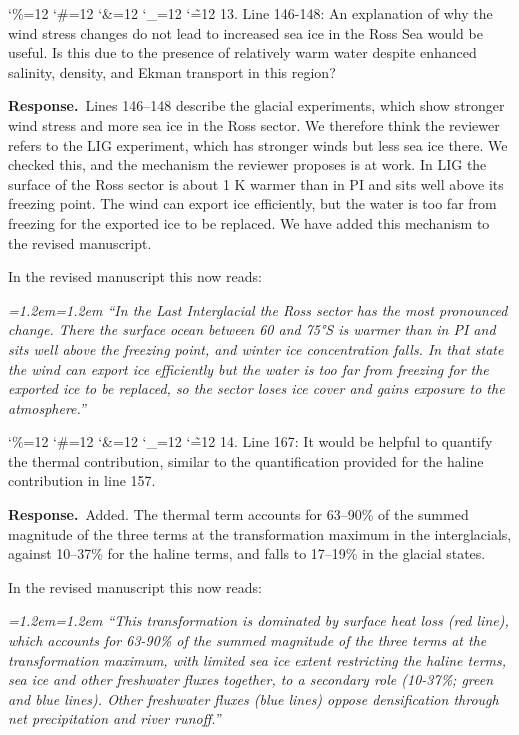 \documentclass[11pt,a4paper]{article}
\newcommand{\comment}[1]{\par\medskip\noindent\color{black}\begingroup\catcode`\%=12 \catcode`\#=12 \catcode`\&=12 \catcode`\_=12 \catcode`\~=12 \commentbody}
\newcommand{\commentbody}[1]{#1\endgroup\par\smallskip}
\newcommand{\response}{\par\noindent\color{chgcol}\textbf{Response.}\ }
\newenvironment{change}{\par\smallskip\color{chgcol}\small\itshape\leftskip=1.2em\rightskip=1.2em\noindent\ignorespaces}{\par\smallskip}
\begin{document}
\textit{ }

\comment{R1}{13. Line 146-148: An explanation of why the wind stress changes do not lead to increased sea ice in the Ross Sea would be useful. Is this due to the presence of relatively warm water despite enhanced salinity, density, and Ekman transport in this region?}

\response Lines 146--148 describe the glacial experiments, which show stronger wind stress and more sea ice in the Ross sector. We therefore think the reviewer refers to the LIG experiment, which has stronger winds but less sea ice there. We checked this, and the mechanism the reviewer proposes is at work. In LIG the surface of the Ross sector is about 1 K warmer than in PI and sits well above its freezing point. The wind can export ice efficiently, but the water is too far from freezing for the exported ice to be replaced. We have added this mechanism to the revised manuscript.


In the revised manuscript this now reads:

\begin{change}
``In the Last Interglacial the Ross sector has the most pronounced change. There the surface ocean between 60 and 75°S is warmer than in PI and sits well above the freezing point, and winter ice concentration falls. In that state the wind can export ice efficiently but the water is too far from freezing for the exported ice to be replaced, so the sector loses ice cover and gains exposure to the atmosphere.''
\end{change} 

 
\comment{R1}{14. Line 167: It would be helpful to quantify the thermal contribution, similar to the quantification provided for the haline contribution in line 157.}

\response Added. The thermal term accounts for 63–90\% of the summed magnitude of the three terms at the transformation maximum in the interglacials, against 10–37\% for the haline terms, and falls to 17–19\% in the glacial states.

In the revised manuscript this now reads:

\begin{change}
``This transformation is dominated by surface heat loss (red line), which accounts for 63-90\% of the summed magnitude of the three terms at the transformation maximum, with limited sea ice extent restricting the haline terms, sea ice and other freshwater fluxes together, to a secondary role (10-37\%; green and blue lines). Other freshwater fluxes (blue lines) oppose densification through net precipitation and river runoff.''
\end{change}
\end{document}
